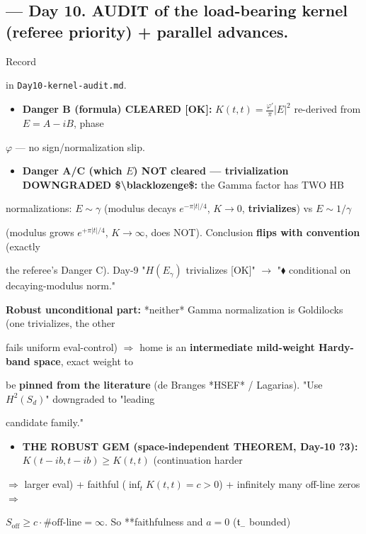 \documentclass[10pt]{article}
\begin{document}
\subsection*{ --- Day 10. AUDIT of the load-bearing kernel (referee priority) + parallel advances.}
Record\par
in \texttt{Day10-kernel-audit.md}.\par
\begin{itemize}
\item \textbf{Danger B (formula) CLEARED [OK]:} $K(t,t)=\tfrac{\varphi'}\pi|E|^2$ re-derived from $E=A-iB$, phase
\end{itemize}
  $\varphi$ --- no sign/normalization slip.\par
\begin{itemize}
\item \textbf{Danger A/C (which $E$) NOT cleared --- trivialization DOWNGRADED \$\textbackslash{}blacklozenge\$:} the Gamma factor has TWO HB
\end{itemize}
  normalizations: $E\sim\gamma$ (modulus decays $e^{-\pi|t|/4}$, $K\to0$, \textbf{trivializes}) vs $E\sim1/\gamma$\par
  (modulus grows $e^{+\pi|t|/4}$, $K\to\infty$, does NOT). Conclusion \textbf{flips with convention} (exactly\par
  the referee's Danger C). Day-9 "$H(E_\gamma)$ trivializes [OK]" \ensuremath{\to} "$\blacklozenge$ conditional on decaying-modulus norm."\par
  \textbf{Robust unconditional part:} *neither* Gamma normalization is Goldilocks (one trivializes, the other\par
  fails uniform eval-control) \ensuremath{\Rightarrow} home is an \textbf{intermediate mild-weight Hardy-band space}, exact weight to\par
  be \textbf{pinned from the literature} (de Branges *HSEF* / Lagarias). "Use $H^2(S_d)$" downgraded to "leading\par
  candidate family."\par
\begin{itemize}
\item \textbf{THE ROBUST GEM (space-independent THEOREM, Day-10 ?3):} $K(t-ib,t-ib)\ge K(t,t)$ (continuation harder
\end{itemize}
  \ensuremath{\Rightarrow} larger eval) + faithful ($\inf_t K(t,t)=c>0$) + infinitely many off-line zeros $\Rightarrow$\par
  $S_{\mathrm{off}}\ge c\cdot\#\text{off-line}=\infty$. So **faithfulness and $a=0$ ($\mathfrak t_-$ bounded)\par
\end{document}
